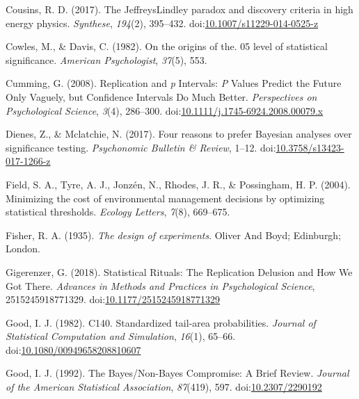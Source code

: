 \documentclass[,jou,floatsintext]{apa6}
\begin{document}
\leavevmode\hypertarget{ref-cousins_jeffreyslindley_2017}{}%
Cousins, R. D. (2017). The JeffreysLindley paradox and discovery criteria in high energy physics. \emph{Synthese}, \emph{194}(2), 395--432. doi:\href{https://doi.org/10.1007/s11229-014-0525-z}{10.1007/s11229-014-0525-z}

\leavevmode\hypertarget{ref-cowles_origins_1982}{}%
Cowles, M., \& Davis, C. (1982). On the origins of the. 05 level of statistical significance. \emph{American Psychologist}, \emph{37}(5), 553.

\leavevmode\hypertarget{ref-cumming_replication_2008}{}%
Cumming, G. (2008). Replication and \emph{p} Intervals: \emph{P} Values Predict the Future Only Vaguely, but Confidence Intervals Do Much Better. \emph{Perspectives on Psychological Science}, \emph{3}(4), 286--300. doi:\href{https://doi.org/10.1111/j.1745-6924.2008.00079.x}{10.1111/j.1745-6924.2008.00079.x}

\leavevmode\hypertarget{ref-dienes_four_2017}{}%
Dienes, Z., \& Mclatchie, N. (2017). Four reasons to prefer Bayesian analyses over significance testing. \emph{Psychonomic Bulletin \& Review}, 1--12. doi:\href{https://doi.org/10.3758/s13423-017-1266-z}{10.3758/s13423-017-1266-z}

\leavevmode\hypertarget{ref-field_minimizing_2004}{}%
Field, S. A., Tyre, A. J., Jonzén, N., Rhodes, J. R., \& Possingham, H. P. (2004). Minimizing the cost of environmental management decisions by optimizing statistical thresholds. \emph{Ecology Letters}, \emph{7}(8), 669--675.

\leavevmode\hypertarget{ref-fisher_design_1935}{}%
Fisher, R. A. (1935). \emph{The design of experiments}. Oliver And Boyd; Edinburgh; London.

\leavevmode\hypertarget{ref-gigerenzer_statistical_2018}{}%
Gigerenzer, G. (2018). Statistical Rituals: The Replication Delusion and How We Got There. \emph{Advances in Methods and Practices in Psychological Science}, 2515245918771329. doi:\href{https://doi.org/10.1177/2515245918771329}{10.1177/2515245918771329}

\leavevmode\hypertarget{ref-good_c140._1982}{}%
Good, I. J. (1982). C140. Standardized tail-area probabilities. \emph{Journal of Statistical Computation and Simulation}, \emph{16}(1), 65--66. doi:\href{https://doi.org/10.1080/00949658208810607}{10.1080/00949658208810607}

\leavevmode\hypertarget{ref-good_bayesux2fnon-bayes_1992}{}%
Good, I. J. (1992). The Bayes/Non-Bayes Compromise: A Brief Review. \emph{Journal of the American Statistical Association}, \emph{87}(419), 597. doi:\href{https://doi.org/10.2307/2290192}{10.2307/2290192}
\end{document}
